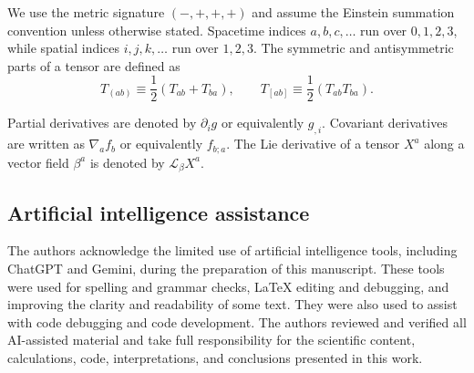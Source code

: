 We use the metric signature $(-,+,+,+)$ and assume the Einstein summation convention unless otherwise stated. Spacetime indices $a,b,c,\ldots$ run over $0,1,2,3$, while spatial indices $i,j,k,\ldots$ run over $1,2,3$. The symmetric and antisymmetric parts of a tensor are defined as
\begin{equation}
T_{(ab)} \equiv \frac{1}{2}\left(T_{ab}+T_{ba}\right),
\qquad
T_{[ab]} \equiv \frac{1}{2}\left(T_{ab} T_{ba}\right).
\end{equation}

Partial derivatives are denoted by $\partial_i g$ or equivalently $g_{,i}$. Covariant derivatives are written as $\nabla_a f_b$ or equivalently $f_{b;a}$. The Lie derivative of a tensor $X^a$ along a vector field $\beta^a$ is denoted by $\mathcal{L}_{\beta}X^a$.

\subsection{Artificial intelligence assistance}
The authors acknowledge the limited use of artificial intelligence tools,
including ChatGPT and Gemini, during the preparation of this manuscript.
These tools were used for spelling and grammar checks, LaTeX editing and
debugging, and improving the clarity and readability of some text. They
were also used to assist with code debugging and code development. The
authors reviewed and verified all AI-assisted material and take full
responsibility for the scientific content, calculations, code,
interpretations, and conclusions presented in this work.
